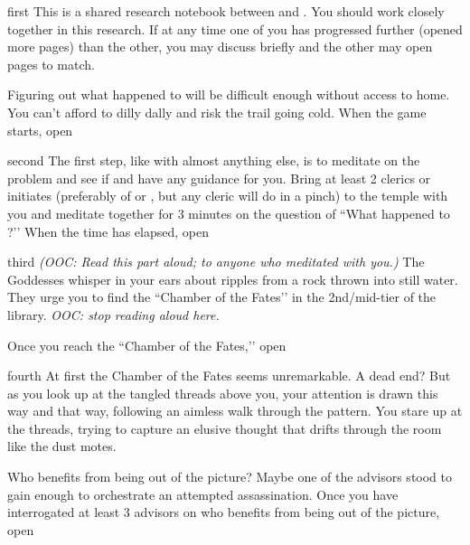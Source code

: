 \documentclass[notebook]{GL2020} %
\begin{document}
\startnotebook{\nFindAssassin{}}

\begin{page}{first}
This is a shared research notebook between \cJuniorStatesman{} and \cPresident{}. You should work closely together in this research. If at any time one of you has progressed further (opened more pages) than the other, you may discuss briefly and the other may open pages to match.

Figuring out what happened to \cHeadDiplomat{} will be difficult enough without access to \cHeadDiplomat{\their} home. You can’t afford to dilly dally and risk the trail going cold. When the game starts, open 
\end{page}

\begin{page}{second}
The first step, like with almost anything else, is to meditate on the problem and see if \cEbb{} and \cFlow{} have any guidance for you. Bring at least 2 clerics or initiates (preferably of \cEbb{} or \cFlow{}, but any cleric will do in a pinch) to the temple with you and meditate together for 3 minutes on the question of ``What happened to \cHeadDiplomat{}?’’ When the time has elapsed, open 
\end{page}

\begin{page}{third}
\emph{(OOC: Read this part aloud; to anyone who meditated with you.)} The Goddesses whisper in your ears about ripples from a rock thrown into still water. They urge you to find the ``Chamber of the Fates’’ in the 2nd/mid-tier of the library. \emph{OOC: stop reading aloud here.}

Once you reach the ``Chamber of the Fates,’’ open 
\end{page}

\begin{page}{fourth}
At first the Chamber of the Fates seems unremarkable. A dead end? But as you look up at the tangled threads above you, your attention is drawn this way and that way, following an aimless walk through the pattern. You stare up at the threads, trying to capture an elusive thought that drifts through the room like the dust motes.

Who benefits from \cHeadDiplomat{} being out of the picture? Maybe one of the advisors stood to gain enough to orchestrate an attempted assassination. Once you have interrogated at least 3 advisors on who benefits from \cHeadDiplomat{} being out of the picture, open 
\end{page}
\end{document}
